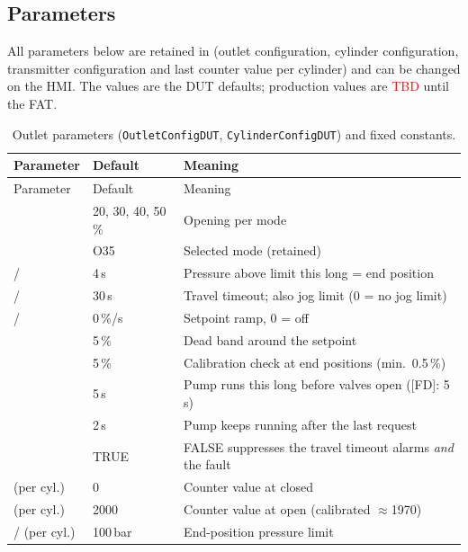 \documentclass[11pt,a4paper]{article}
\newcommand{\TBD}{\textcolor{red}{TBD}}
\begin{document}
\subsection{Parameters}
All parameters below are retained in  (outlet configuration, cylinder
configuration, transmitter configuration and last counter value per cylinder) and can be changed on
the HMI. The values are the DUT defaults; production values are \TBD{} until the FAT.
\begin{small}
\begin{longtable}{@{}P{48mm}P{22mm}P{80mm}@{}}
\caption{Outlet parameters (\texttt{OutletConfigDUT}, \texttt{CylinderConfigDUT}) and fixed constants.}\label{tab:param}\\
\toprule
Parameter & Default & Meaning \\
\midrule
\endfirsthead
\toprule
Parameter & Default & Meaning \\
\midrule
\endhead
\bottomrule
\endfoot
{} & 20, 30, 40, 50\,\% & Opening per mode  \\
 & O35 & Selected mode (retained) \\
 /  & 4\,s & Pressure above limit this long = end position \\
 /  & 30\,s & Travel timeout; also jog limit (0 = no jog limit)  \\
 /  & 0\,\%/s & Setpoint ramp, 0 = off \\
 & 5\,\% & Dead band around the setpoint \\
 & 5\,\% & Calibration check at end positions (min.\ 0.5\,\%) \\
 & 5\,s & Pump runs this long before valves open ([FD]: 5\,s) \\
 & 2\,s & Pump keeps running after the last request \\
 & TRUE & FALSE suppresses the travel timeout alarms \emph{and} the fault \\
\midrule
{} (per cyl.) & 0 & Counter value at closed \\
 (per cyl.) & 2000 & Counter value at open (calibrated $\approx$1970) \\
 /  (per cyl.) & 100\,bar & End-position pressure limit  \\

\end{longtable}
\end{small}
\end{document}
